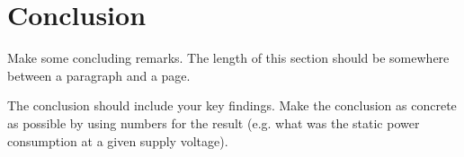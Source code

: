 \section{Conclusion}
\label{sec:conclution}

Make some concluding remarks. The length of this section should be somewhere between a paragraph and a page.

The conclusion should include your key findings. Make the conclusion as concrete as possible by using numbers for the result (e.g. what was the static power consumption at a given supply voltage).